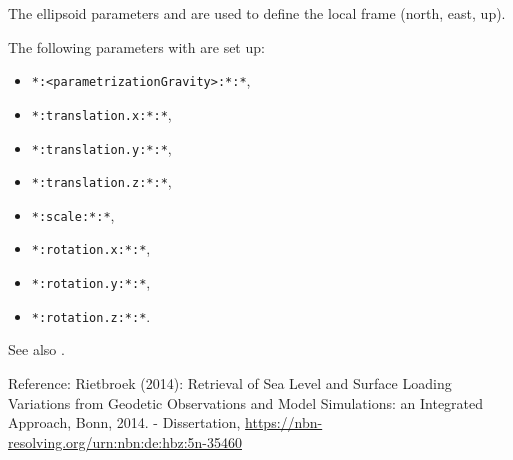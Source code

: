 The ellipsoid parameters  and  are used
to define the local frame (north, east, up).

The following parameters with  are set up:
\begin{itemize}
\item \verb|*:<parametrizationGravity>:*:*|,
\item \verb|*:translation.x:*:*|,
\item \verb|*:translation.y:*:*|,
\item \verb|*:translation.z:*:*|,
\item \verb|*:scale:*:*|,
\item \verb|*:rotation.x:*:*|,
\item \verb|*:rotation.y:*:*|,
\item \verb|*:rotation.z:*:*|.
\end{itemize}

See also .

Reference:
Rietbroek (2014): Retrieval of Sea Level and Surface Loading Variations from Geodetic Observations
and Model Simulations: an Integrated Approach, Bonn, 2014. - Dissertation,
\url{https://nbn-resolving.org/urn:nbn:de:hbz:5n-35460}


